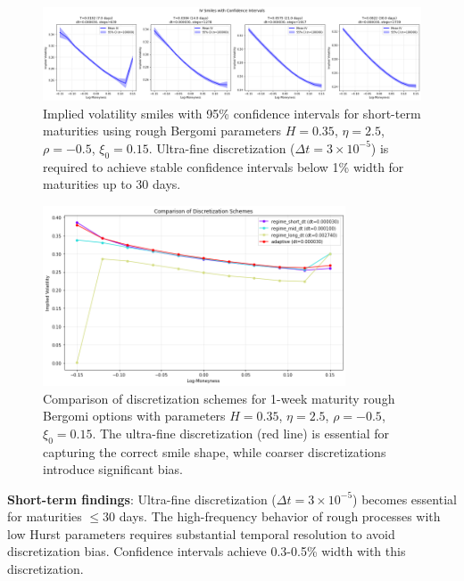 	\begin{figure}[ht]
		\centering
		\includegraphics[width=\textwidth]{../images/short_regime_discretization_confidence.png}
		\caption{Implied volatility smiles with 95\% confidence intervals for short-term maturities using rough Bergomi parameters $H = 0.35$, $\eta = 2.5$, $\rho = -0.5$, $\xi_0 = 0.15$. Ultra-fine discretization ($\Delta t = 3 \times 10^{-5}$) is required to achieve stable confidence intervals below 1\% width for maturities up to 30 days.}
		\label{fig:discretization-short}
	\end{figure}
	
	\begin{figure}[ht]
		\centering
		\includegraphics[width=0.8\textwidth]{../images/short_regime_discretization_schemes.png}
		\caption{Comparison of discretization schemes for 1-week maturity rough Bergomi options with parameters $H = 0.35$, $\eta = 2.5$, $\rho = -0.5$, $\xi_0 = 0.15$. The ultra-fine discretization (red line) is essential for capturing the correct smile shape, while coarser discretizations introduce significant bias.}
		\label{fig:discretization-schemes-short}
	\end{figure}
	
	\textbf{Short-term findings}: Ultra-fine discretization ($\Delta t = 3 \times 10^{-5}$) becomes essential for maturities $\leq 30$ days. The high-frequency behavior of rough processes with low Hurst parameters requires substantial temporal resolution to avoid discretization bias. Confidence intervals achieve 0.3-0.5\% width with this discretization.
	
